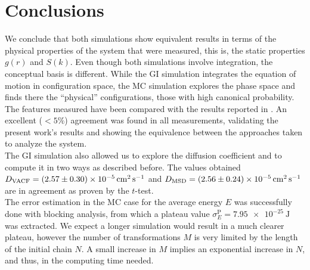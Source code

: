 \documentclass[%
aps,
pra,%
amsmath,amssymb,
preprint,%
reprint,%
notitlepage,
a4paper]{revtex4-1}
\begin{document}
\section{Conclusions}
We conclude that both simulations show equivalent results in terms of the physical properties of the system that were measured, this is, the static properties $g(r)$ and $S(k)$. Even though both simulations involve integration, the conceptual basis is different. While the GI simulation integrates the equation of motion in configuration space, the MC simulation explores the phase space and finds there the ``physical'' configurations, those with high canonical probability.\\
The features measured have been compared with the results reported in \citet{Rahman1964}. An excellent ($<5\%$) agreement was found in all measurements, validating the present work's results and showing the equivalence between the approaches taken to analyze the system.\\
The GI simulation also allowed us to explore the diffusion coefficient and to compute it in two ways as described before. The values obtained $D_\mathrm{VACF} = \SI{2,57 \pm 0.3e-5}{\square\centi\meter\per\second}$ and $D_{\mathrm{MSD}} = \SI{2.56 \pm 0.24 e-5}{\square\centi\meter\per\second}$ are in agreement as proven by the $t$-test.\\
The error estimation in the MC case for the average energy $E$ was successfully done with blocking analysis, from which a plateau value $\sigma_E^\mathrm{P} = \SI{7.95e-25}{\joule}$ was extracted. We expect a longer simulation would result in a much clearer plateau, however the number of transformations $M$ is very limited by the length of the initial chain $N$. A small increase in $M$ implies an exponential increase in $N$, and thus, in the computing time needed.




	
\end{document}
